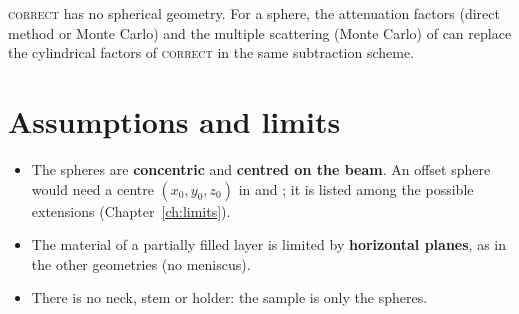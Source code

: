 \begin{note}
\textsc{correct} has no spherical geometry. For a sphere, the attenuation factors (direct method or Monte Carlo) and the multiple
scattering (Monte Carlo) of \mcams{} can replace the cylindrical factors of \textsc{correct} in the same subtraction scheme.
\end{note}

\section{Assumptions and limits}

\begin{itemize}
  \item The spheres are \textbf{concentric} and \textbf{centred on the beam}. An offset sphere would need a centre $(x_0,y_0,z_0)$ in
         and ; it is listed among the possible extensions (Chapter~\ref{ch:limits}).
  \item The material of a partially filled layer is limited by \textbf{horizontal planes}, as in the other geometries (no meniscus).
  \item There is no neck, stem or holder: the sample is only the spheres.
\end{itemize}
